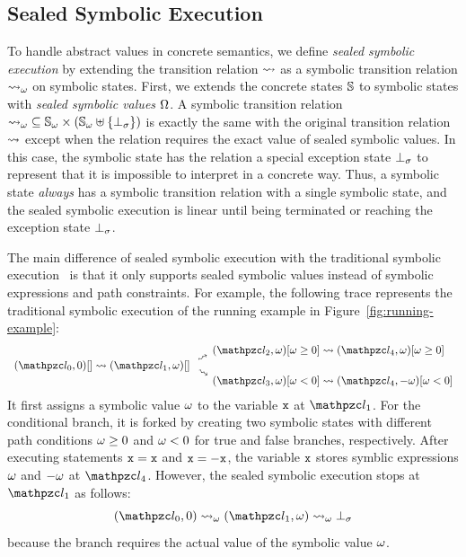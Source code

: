 \subsection{Sealed Symbolic Execution}

To handle abstract values in concrete semantics, we define \textit{sealed
symbolic execution} by extending the transition relation $\leadsto$ as a symbolic
transition relation ${\leadsto}_\omega$ on symbolic states.  First, we extends the
concrete states $\mathbb{S}$ to symbolic states with \textit{sealed symbolic values}
$\Omega$.  A symbolic transition relation ${\leadsto}_\omega \subseteq {\mathbb{S}}_\omega
\times ({\mathbb{S}}_\omega \uplus \{ \bot_\sigma \})$ is exactly the same with the original
transition relation $\leadsto$ except when the relation requires the exact value
of sealed symbolic values.  In this case, the symbolic state has the relation a
special exception state $\bot_\sigma$ to represent that it is impossible to interpret
in a concrete way.  Thus, a symbolic state \textit{always} has a symbolic
transition relation with a single symbolic state, and the sealed symbolic
execution is linear until being terminated or reaching the exception state
$\bot_\sigma$.

The main difference of sealed symbolic execution with the traditional symbolic
execution~\cite{symbolic} is that it only supports sealed symbolic values
instead of symbolic expressions and path constraints.  For example, the
following trace represents the traditional symbolic execution of the running
example in Figure~\ref{fig:running-example}:
\[
  \begin{array}{r@{~}c@{~}l}
    &&(\lab_2, \symb)[\symb \geq 0] \trans (\lab_4, \symb)[\symb \geq 0]
    \vspace*{-0.5em}\\
    &\rutrans&
    \vspace*{-0.5em}\\
    (\lab_0, 0)[] \trans (\lab_1, \symb)[]&&
    \vspace*{-0.5em}\\
    &\rdtrans&
    \vspace*{-0.5em}\\
    &&(\lab_3, \symb)[\symb < 0] \trans (\lab_4, -\symb)[\symb < 0]\\
  \end{array}
\]
It first assigns a symbolic value $\omega$ to the variable $\texttt{x}$ at $\lab_1$.
For the conditional branch, it is forked by creating two symbolic states with
different path conditions $\omega \geq 0$ and $\omega < 0$ for true and false
branches, respectively.  After executing statements $\texttt{x} = \texttt{x}$ and $\texttt{x} =
-\texttt{x}$, the variable $\texttt{x}$ stores symblic expressions $\omega$ and $-\omega$ at
$\lab_4$.  However, the sealed symbolic execution stops at $\lab_1$ as follows:
\[
  (\lab_0, 0) \; \symbtrans \; (\lab_1, \symb) \; \symbtrans \; \excst
\]
because the branch requires the actual value of the symbolic value $\omega$.

